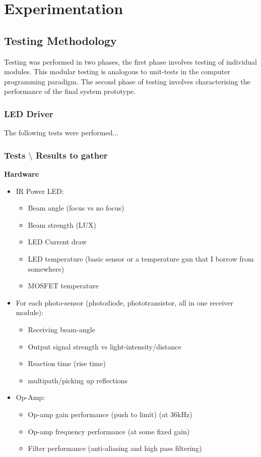 \chapter{Experimentation}
\label{ch_experimentation}

\section{Testing Methodology}

Testing was performed in two phases, the first phase involves testing of individual modules. This modular testing is analogous to unit-tests in the computer programming paradigm. The second phase of testing involves characterising the performance of the final system prototype.

\subsection{LED Driver}
The following tests were performed...

\subsection{Tests $\setminus$ Results to gather}
\textbf{Hardware}
\begin{itemize}
	\item IR Power LED:
	\begin{itemize}
		\item Beam angle (focus vs no focus)
		\item Beam strength (LUX)
		\item LED Current draw
		\item LED temperature (basic sensor or a temperature gun that I borrow from somewhere)
		\item MOSFET temperature
	\end{itemize}
	\item For each photo-sensor (photodiode, phototransistor, all in one receiver module):
	\begin{itemize}
		\item Receiving beam-angle
		\item Output signal strength vs light-intensity/distance
		\item Reaction time (rise time)
		\item multipath/picking up reflections
	\end{itemize}
	\item Op-Amp:
	\begin{itemize}
		\item Op-amp gain performance (push to limit) (at 36kHz)
		\item Op-amp frequency performance (at some fixed gain)
		\item Filter performance (anti-aliasing and high pass filtering)
	\end{itemize}
\end{itemize}

